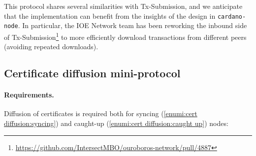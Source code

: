 This protocol shares several similarities with Tx-Submission, and we anticipate that the implementation can benefit from the insights of the design in \texttt{cardano-node}.
In particular, the IOE Network team has been reworking the inbound side of Tx-Submission\footnote{\url{https://github.com/IntersectMBO/ouroboros-network/pull/4887}} to more efficiently download transactions from different peers (avoiding repeated downloads).

\subsection{Certificate diffusion mini-protocol}%
\label{sec:certificate-diffusion}

\paragraph{Requirements.}

Diffusion of certificates is required both for syncing (\ref{enumi:cert diffusion:syncing}) and caught-up (\ref{enumi:cert diffusion:caught up}) nodes:


